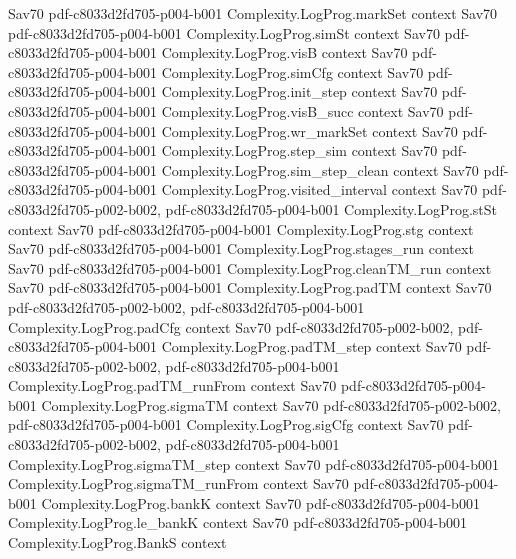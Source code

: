 \begin{theorem}
  {Sav70}
  {pdf-c8033d2fd705-p004-b001}
\proofstep
  {Complexity.LogProg.markSet}
  {context}
  {Sav70}
  {pdf-c8033d2fd705-p004-b001}
\proofstep
  {Complexity.LogProg.simSt}
  {context}
  {Sav70}
  {pdf-c8033d2fd705-p004-b001}
\proofstep
  {Complexity.LogProg.visB}
  {context}
  {Sav70}
  {pdf-c8033d2fd705-p004-b001}
\proofstep
  {Complexity.LogProg.simCfg}
  {context}
  {Sav70}
  {pdf-c8033d2fd705-p004-b001}
\proofstep
  {Complexity.LogProg.init_step}
  {context}
  {Sav70}
  {pdf-c8033d2fd705-p004-b001}
\proofstep
  {Complexity.LogProg.visB_succ}
  {context}
  {Sav70}
  {pdf-c8033d2fd705-p004-b001}
\proofstep
  {Complexity.LogProg.wr_markSet}
  {context}
  {Sav70}
  {pdf-c8033d2fd705-p004-b001}
\proofstep
  {Complexity.LogProg.step_sim}
  {context}
  {Sav70}
  {pdf-c8033d2fd705-p004-b001}
\proofstep
  {Complexity.LogProg.sim_step_clean}
  {context}
  {Sav70}
  {pdf-c8033d2fd705-p004-b001}
\proofstep
  {Complexity.LogProg.visited_interval}
  {context}
  {Sav70}
  {pdf-c8033d2fd705-p002-b002,
    pdf-c8033d2fd705-p004-b001}
\proofstep
  {Complexity.LogProg.stSt}
  {context}
  {Sav70}
  {pdf-c8033d2fd705-p004-b001}
\proofstep
  {Complexity.LogProg.stg}
  {context}
  {Sav70}
  {pdf-c8033d2fd705-p004-b001}
\proofstep
  {Complexity.LogProg.stages_run}
  {context}
  {Sav70}
  {pdf-c8033d2fd705-p004-b001}
\proofstep
  {Complexity.LogProg.cleanTM_run}
  {context}
  {Sav70}
  {pdf-c8033d2fd705-p004-b001}
\proofstep
  {Complexity.LogProg.padTM}
  {context}
  {Sav70}
  {pdf-c8033d2fd705-p002-b002,
    pdf-c8033d2fd705-p004-b001}
\proofstep
  {Complexity.LogProg.padCfg}
  {context}
  {Sav70}
  {pdf-c8033d2fd705-p002-b002,
    pdf-c8033d2fd705-p004-b001}
\proofstep
  {Complexity.LogProg.padTM_step}
  {context}
  {Sav70}
  {pdf-c8033d2fd705-p002-b002,
    pdf-c8033d2fd705-p004-b001}
\proofstep
  {Complexity.LogProg.padTM_runFrom}
  {context}
  {Sav70}
  {pdf-c8033d2fd705-p004-b001}
\proofstep
  {Complexity.LogProg.sigmaTM}
  {context}
  {Sav70}
  {pdf-c8033d2fd705-p002-b002,
    pdf-c8033d2fd705-p004-b001}
\proofstep
  {Complexity.LogProg.sigCfg}
  {context}
  {Sav70}
  {pdf-c8033d2fd705-p002-b002,
    pdf-c8033d2fd705-p004-b001}
\proofstep
  {Complexity.LogProg.sigmaTM_step}
  {context}
  {Sav70}
  {pdf-c8033d2fd705-p004-b001}
\proofstep
  {Complexity.LogProg.sigmaTM_runFrom}
  {context}
  {Sav70}
  {pdf-c8033d2fd705-p004-b001}
\proofstep
  {Complexity.LogProg.bankK}
  {context}
  {Sav70}
  {pdf-c8033d2fd705-p004-b001}
\proofstep
  {Complexity.LogProg.le_bankK}
  {context}
  {Sav70}
  {pdf-c8033d2fd705-p004-b001}
\proofstep
  {Complexity.LogProg.BankS}
  {context}

\end{theorem}
